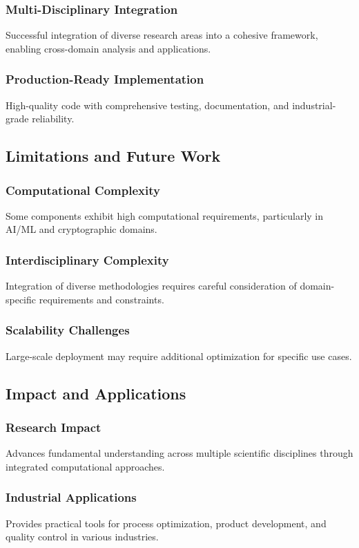 \documentclass[11pt,a4paper]{article}
\begin{document}
\subsubsection{Multi-Disciplinary Integration}
Successful integration of diverse research areas into a cohesive framework, enabling cross-domain analysis and applications.

\subsubsection{Production-Ready Implementation}
High-quality code with comprehensive testing, documentation, and industrial-grade reliability.

\subsection{Limitations and Future Work}

\subsubsection{Computational Complexity}
Some components exhibit high computational requirements, particularly in AI/ML and cryptographic domains.

\subsubsection{Interdisciplinary Complexity}
Integration of diverse methodologies requires careful consideration of domain-specific requirements and constraints.

\subsubsection{Scalability Challenges}
Large-scale deployment may require additional optimization for specific use cases.

\subsection{Impact and Applications}

\subsubsection{Research Impact}
Advances fundamental understanding across multiple scientific disciplines through integrated computational approaches.

\subsubsection{Industrial Applications}
Provides practical tools for process optimization, product development, and quality control in various industries.
\end{document}
